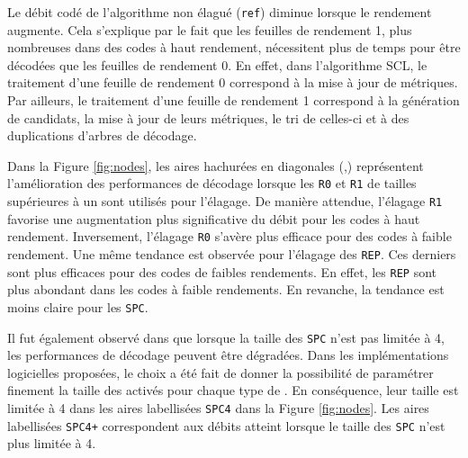 Le débit codé de l'algorithme non élagué (\texttt{ref}) diminue lorsque le rendement augmente. Cela s'explique par le fait que les feuilles de rendement 1, plus nombreuses dans des codes à haut rendement, nécessitent plus de temps pour être décodées que les feuilles de rendement 0. En effet, dans l'algorithme SCL, le traitement d'une feuille de rendement 0 correspond à la mise à jour de métriques. Par ailleurs, le traitement d'une feuille de rendement 1 correspond à la génération de candidats, la mise à jour de leurs métriques, le tri de celles-ci et à des duplications d'arbres de décodage.

Dans la Figure \ref{fig:nodes}, les aires hachurées en diagonales (,) représentent l'amélioration des performances de décodage lorsque les \noeuds \texttt{R0} et \texttt{R1} de tailles supérieures à un sont utilisés pour l'élagage. De manière attendue, l'élagage \texttt{R1} favorise une augmentation plus significative du débit pour les codes à haut rendement. Inversement, l'élagage \texttt{R0} s'avère plus efficace pour des codes à faible rendement. Une même tendance est observée pour l'élagage des \noeuds \texttt{REP}. Ces derniers sont plus efficaces pour des codes de faibles rendements. En effet, les \noeuds \texttt{REP} sont plus abondant dans les codes à faible rendements. En revanche, la tendance est moins claire pour les \noeuds \texttt{SPC}.

Il fut également observé dans \cite{sarkis_fast_2014} que lorsque la taille des \noeuds \texttt{SPC} n'est pas limitée à 4, les performances de décodage peuvent être dégradées. Dans les implémentations logicielles proposées, le choix a été fait de donner la possibilité de paramétrer finement la taille des \noeuds activés pour chaque type de \noeuds. En conséquence, leur taille est limitée à 4 dans les aires labellisées \texttt{SPC4} dans la Figure \ref{fig:nodes}. Les aires labellisées \noeuds \texttt{SPC4+} correspondent aux débits atteint lorsque le taille des \noeuds \texttt{SPC} n'est plus limitée à 4.

